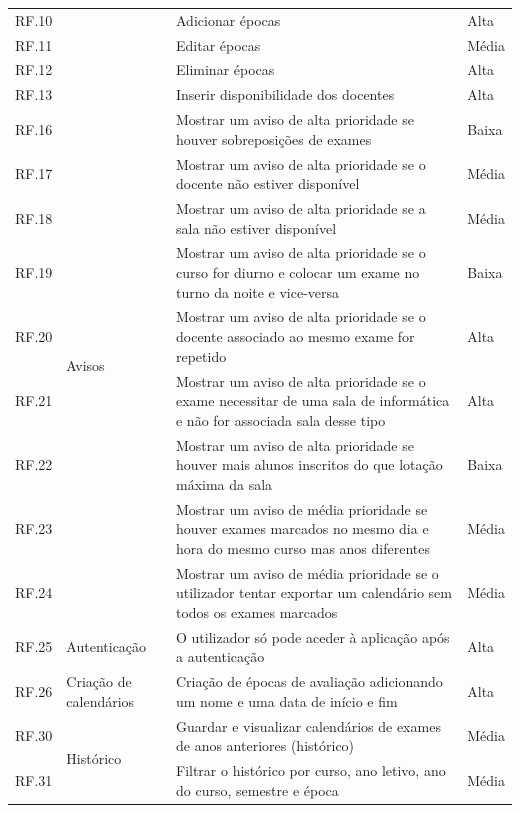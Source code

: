 \documentclass[12pt, twoside]{report}
\begin{document}
\begin{center}
\begin{longtable}{|m{1cm}|m{2.2cm}|m{10cm}|m{2cm}|}
			RF.10 && Adicionar épocas & Alta\\
			
			RF.11 && Editar épocas & Média\\
			
			RF.12 && Eliminar épocas & Alta\\
			
			RF.13 && Inserir disponibilidade dos docentes & Alta\\
			\hline
			
			RF.16 &\multirow{9}{2cm}{Avisos}& Mostrar um aviso de alta prioridade se houver sobreposições de exames & Baixa\\
						
			RF.17 && Mostrar um aviso de alta prioridade se o docente não estiver disponível & Média \\
			
			RF.18 && Mostrar um aviso de alta prioridade se a sala não estiver disponível & Média\\
			
			RF.19 && Mostrar um aviso de alta prioridade se o curso for diurno e colocar um exame no turno da noite e vice-versa & Baixa\\
			
			RF.20&&Mostrar um aviso de alta prioridade se o docente associado ao mesmo exame for repetido & Alta \\
			
			RF.21 && Mostrar um aviso de alta prioridade se o exame necessitar de uma sala de informática e não for associada sala desse tipo & Alta\\
			
			RF.22 && Mostrar um aviso de alta prioridade se houver mais alunos inscritos do que  lotação máxima da sala & Baixa\\
			
			RF.23 && Mostrar um aviso de média prioridade se houver exames marcados no mesmo dia e hora do mesmo curso mas anos diferentes & Média\\
			
			RF.24 && Mostrar um aviso de média prioridade se o utilizador tentar exportar um calendário sem todos os exames marcados & Média\\
			
			\hline
			
			RF.25 &Autenticação& O utilizador só pode aceder à aplicação após a autenticação & Alta\\
			\hline
			
			RF.26 &\multirow{1}{2cm}{Criação de calendários}& Criação de épocas de avaliação adicionando um nome e uma data de início e fim & Alta \\
	
			\hline
			RF.30 &\multirow{2}{*}{Histórico}& Guardar e visualizar calendários de exames de anos anteriores (histórico)& Média \\
			
			RF.31 && Filtrar o histórico por curso, ano letivo, ano do curso, semestre e época& Média \\
			\hline
		\end{longtable}
	\end{center}
\end{document}
